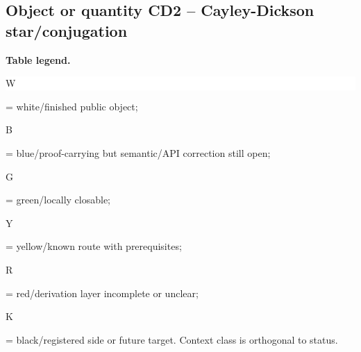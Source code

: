 \subsection*{Object or quantity CD2 -- Cayley-Dickson star/\allowbreak{}conjugation}
\hypertarget{objproof:CD2}{}
\par\smallskip\noindent\begin{minipage}{0.99\linewidth}\footnotesize\raggedright\textbf{Table legend.} \colorbox{white}{\strut W} = white/finished public object; \colorbox{cyan!20}{\strut B} = blue/proof-carrying but semantic/API correction still open; \colorbox{green!18}{\strut G} = green/locally closable; \colorbox{yellow!25}{\strut Y} = yellow/known route with prerequisites; \colorbox{red!20}{\strut R} = red/derivation layer incomplete or unclear; \colorbox{black!18}{\strut K} = black/registered side or future target. Context class is orthogonal to status.\end{minipage}\par\vspace{0.25em}

